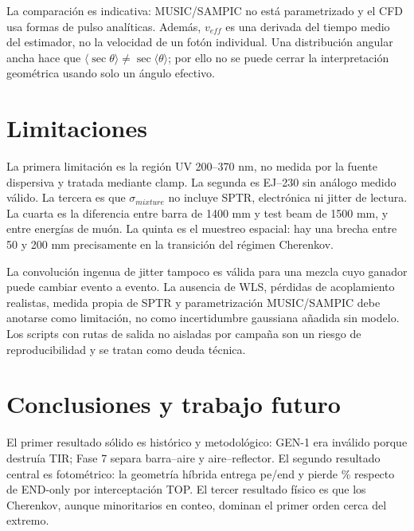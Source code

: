 
La comparación es indicativa: MUSIC/SAMPIC no está parametrizado y el CFD usa formas de pulso analíticas. Además, $v_{eff}$ es una derivada del tiempo medio del estimador, no la velocidad de un fotón individual. Una distribución angular ancha hace que $\langle\sec\theta\rangle\ne\sec\langle\theta\rangle$; por ello no se puede cerrar la interpretación geométrica usando solo un ángulo efectivo.

\chapter{Limitaciones}
La primera limitación es la región UV 200--370 nm, no medida por la fuente dispersiva y tratada mediante clamp. La segunda es EJ--230 sin análogo medido válido. La tercera es que $\sigma_{mixture}$ no incluye SPTR, electrónica ni jitter de lectura. La cuarta es la diferencia entre barra de 1400 mm y test beam de 1500 mm, y entre energías de muón. La quinta es el muestreo espacial: hay una brecha entre 50 y 200 mm precisamente en la transición del régimen Cherenkov.

La convolución ingenua de jitter tampoco es válida para una mezcla cuyo ganador puede cambiar evento a evento. La ausencia de WLS, pérdidas de acoplamiento realistas, medida propia de SPTR y parametrización MUSIC/SAMPIC debe anotarse como limitación, no como incertidumbre gaussiana añadida sin modelo. Los scripts con rutas de salida no aisladas por campaña son un riesgo de reproducibilidad y se tratan como deuda técnica.

\chapter{Conclusiones y trabajo futuro}
El primer resultado sólido es histórico y metodológico: GEN-1 era inválido porque destruía TIR; Fase 7 separa barra--aire y aire--reflector. El segundo resultado central es fotométrico: la geometría híbrida entrega \HybridNpePerEnd{} pe/end y pierde \TopInterceptedPct\% respecto de END-only por interceptación TOP. El tercer resultado físico es que los Cherenkov, aunque minoritarios en conteo, dominan el primer orden cerca del extremo.

